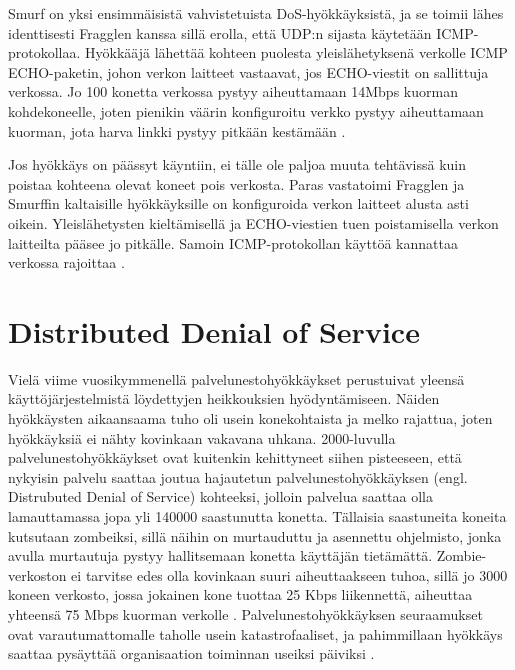 Smurf on yksi ensimmäisistä vahvistetuista DoS-hyökkäyksistä, ja se
toimii lähes identtisesti Fragglen kanssa sillä erolla, että UDP:n
sijasta käytetään ICMP-pro\-to\-kol\-laa. Hyökkääjä lähettää kohteen
puolesta yleislähetyksenä verkolle ICMP ECHO-paketin, johon verkon
laitteet vastaavat, jos ECHO-viestit on sallittuja verkossa. Jo 100
konetta verkossa pystyy aiheuttamaan 14Mbps kuorman kohdekoneelle,
joten pienikin väärin konfiguroitu verkko pystyy aiheuttamaan kuorman,
jota harva linkki pystyy pitkään kestämään \cite{Hacking}.

Jos hyökkäys on päässyt käyntiin, ei tälle ole paljoa muuta tehtävissä
kuin poistaa kohteena olevat koneet pois verkosta. Paras vastatoimi
Fragglen ja Smurffin kaltaisille hyökkäyksille on konfiguroida
verkon laitteet alusta asti oikein. Yleislähetysten kieltämisellä ja
ECHO-viestien tuen poistamisella verkon laitteilta pääsee jo
pitkälle. Samoin ICMP-protokollan käyttöä kannattaa verkossa rajoittaa
\cite{Hacking}.

\section{Distributed Denial of Service}

Vielä viime vuosikymmenellä palvelunestohyökkäykset perustuivat yleensä
käyttöjärjestelmistä löydettyjen heikkouksien hyödyntämiseen. Näiden
hyökkäysten aikaansaama tuho oli usein konekohtaista ja melko rajattua, joten
hyökkäyksiä ei nähty kovinkaan vakavana uhkana. 2000-luvulla
palvelunestohyökkäykset ovat kuitenkin kehittyneet siihen pisteeseen, että
nykyisin palvelu saattaa joutua hajautetun palvelunestohyökkäyksen (engl.
Distrubuted Denial of Service) kohteeksi, jolloin palvelua saattaa olla
lamauttamassa jopa yli 140000 saastunutta konetta. Tällaisia saastuneita
koneita kutsutaan zombeiksi, sillä näihin on murtauduttu ja asennettu
ohjelmisto, jonka avulla murtautuja pystyy hallitsemaan konetta käyttäjän
tietämättä. Zombie-verkoston ei tarvitse edes olla kovinkaan suuri
aiheuttaakseen tuhoa, sillä jo 3000 koneen verkosto, jossa jokainen kone
tuottaa 25 Kbps liikennettä, aiheuttaa yhteensä 75 Mbps kuorman verkolle \cite{Hacking}.
Palvelunestohyökkäyksen seuraamukset ovat varautumattomalle
taholle usein katastrofaaliset, ja pahimmillaan hyökkäys saattaa pysäyttää
organisaation toiminnan useiksi päiviksi \cite{CERT}.

